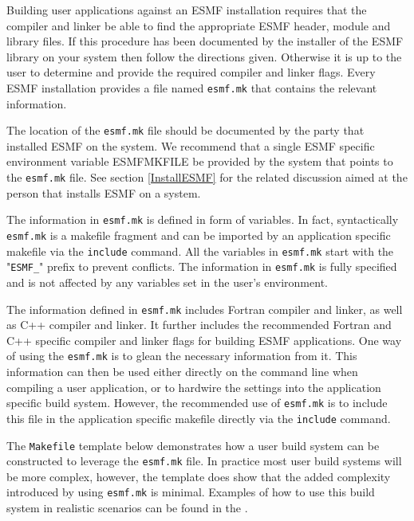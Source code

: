 


Building user applications against an ESMF installation requires that the compiler and linker be able to find the appropriate ESMF header, module and library files. If this procedure has been documented by the installer of the ESMF library on your system then follow the directions given. Otherwise it is up to the user to determine and provide the required compiler and linker flags. Every ESMF installation provides a file named {\tt esmf.mk} that contains the relevant information.

The location of the {\tt esmf.mk} file should be documented by the party that installed ESMF on the system. We recommend that a single ESMF specific environment variable ESMFMKFILE be provided by the system that points to the {\tt esmf.mk} file. See section \ref{InstallESMF} for the related discussion aimed at the person that installs ESMF on a system.

The information in {\tt esmf.mk} is defined in form of variables. In fact, syntactically {\tt esmf.mk} is a makefile fragment and can be imported by an application specific makefile via the {\tt include} command. All the variables in {\tt esmf.mk} start with the "{\tt ESMF\_}" prefix to prevent conflicts. The information in {\tt esmf.mk} is fully specified and is not affected by any variables set in the user's environment.

The information defined in {\tt esmf.mk} includes Fortran compiler and linker, as well as C++ compiler and linker. It further includes the recommended Fortran and C++ specific compiler and linker flags for building ESMF applications. One way of using the {\tt esmf.mk} is to glean the necessary information from it. This information can then be used either directly on the command line when compiling a user application, or to hardwire the settings into the application specific build system. However, the recommended use of {\tt esmf.mk} is to include this file in the application specific makefile directly via the {\tt include} command.

The {\tt Makefile} template below demonstrates how a user build system can be constructed to leverage the {\tt esmf.mk} file. In practice most user build systems will be more complex, however, the template does show that the added complexity introduced by using {\tt esmf.mk} is minimal. Examples of how to use this build system in realistic scenarios can be found in the .


